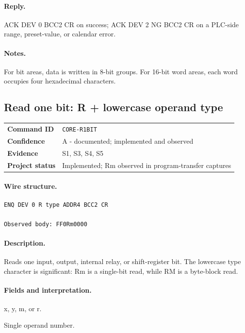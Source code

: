 \documentclass[10pt,letterpaper]{article}
\begin{document}
\paragraph{Reply.} ACK DEV 0 BCC2 CR on success; ACK DEV 2 NG BCC2 CR on a PLC-side range, preset-value, or calendar error.
\paragraph{Notes.} For bit areas, data is written in 8-bit groups. For 16-bit word areas, each word occupies four hexadecimal characters.

\subsection{Read one bit: R + lowercase operand type}
\begin{tabularx}{\textwidth}{@{}>{\bfseries}p{2.8cm}X@{}}
Command ID & \texttt{CORE-R1BIT} \\
Confidence & A - documented; implemented and observed \\
Evidence & S1, S3, S4, S5 \\
Project status & Implemented; Rm observed in program-transfer captures \\
\end{tabularx}
\vspace{0.35em}
\paragraph{Wire structure.}
\begin{Verbatim}[breaklines=true,breakanywhere=true,fontsize=\small]
ENQ DEV 0 R type ADDR4 BCC2 CR

Observed body: FF0Rm0000
\end{Verbatim}
\paragraph{Description.} Reads one input, output, internal relay, or shift-register bit. The lowercase type character is significant: Rm is a single-bit read, while RM is a byte-block read.
\paragraph{Fields and interpretation.}
\begin{description}[style=nextline,leftmargin=3.2cm,labelwidth=3.0cm,font=\normalfont\bfseries]
\item[type] x, y, m, or r.
\item[ADDR4] Single operand number.
\end{description}
\end{document}
